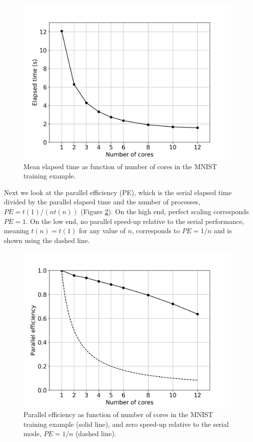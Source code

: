 \documentclass[sigplan, review=false, screen=true, balance=true]{acmart}
\begin{document}
\begin{figure}[H]
  \centering
  \includegraphics[width=\columnwidth]{../figures/nf-parallel-elapsed.png}
  \caption{Mean elapsed time as function of number of cores in the MNIST training example.}
  \label{fig_mnist_elapsed}
\end{figure}

Next we look at the parallel efficiency (PE), which is the serial elapsed time
divided by the parallel elapsed time and the number of processes,
$PE = t(1) / (n t(n))$ (Figure \ref{fig_mnist_efficiency}).
On the high end, perfect scaling corresponds $PE = 1$.
On the low end, no parallel speed-up relative to the serial performance,
meaning $t(n) = t(1)$ for any value of $n$, corresponds to $PE = 1/n$ and 
is shown using the dashed line.

\begin{figure}[H]
  \centering
  \includegraphics[width=\columnwidth]{../figures/nf-parallel-efficiency.png}
	\caption{Parallel efficiency as function of number of cores in the MNIST training example (solid line),
	   and zero speed-up relative to the serial mode, $PE = 1/n$ (dashed line).}
  \label{fig_mnist_efficiency}
\end{figure}
\end{document}
